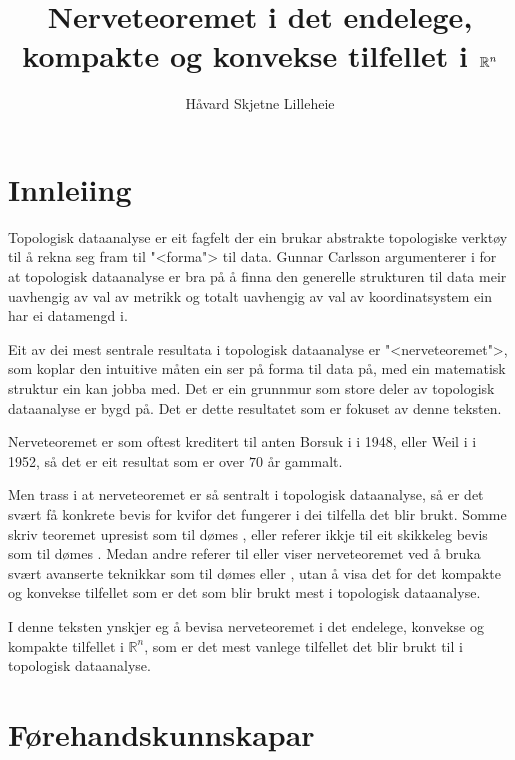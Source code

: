\documentclass[a4paper, 12pt, norsk]{article}
\title{Nerveteoremet i det endelege, kompakte og konvekse tilfellet i \( \Rb^n \)}
\author{Håvard Skjetne Lilleheie}
\theoremstyle{plain}
\theoremstyle{definition}
\newcommand{\Rb}{\mathbb{R}}
\begin{document}
\maketitle

\tableofcontents

\newpage

\section{Innleiing} \label{sec:innleiing}

Topologisk dataanalyse er eit fagfelt der ein brukar abstrakte topologiske verktøy til å rekna seg fram til "<forma"> til data. Gunnar Carlsson argumenterer i \cite{MR2476414} for at topologisk dataanalyse er bra på å finna den generelle strukturen til data meir uavhengig av val av metrikk og totalt uavhengig av val av koordinatsystem ein har ei datamengd i.

Eit av dei mest sentrale resultata i topologisk dataanalyse er "<nerveteoremet">, som koplar den intuitive måten ein ser på forma til data på, med ein matematisk struktur ein kan jobba med. Det er ein grunnmur som store deler av topologisk dataanalyse er bygd på. Det er dette resultatet som er fokuset av denne teksten.

Nerveteoremet er som oftest kreditert til anten Borsuk i \cite{MR28019} i 1948, eller Weil i \cite{MR50280} i 1952, så det er eit resultat som er over \( 70 \) år gammalt.

Men trass i at nerveteoremet er så sentralt i topologisk dataanalyse, så er det svært få konkrete bevis for kvifor det fungerer i dei tilfella det blir brukt. Somme skriv teoremet upresist som til dømes \cite[Theorem 2.1]{MR4381505}, eller referer ikkje til eit skikkeleg bevis som til dømes \cite[Lemma 4.11]{MR3408277}. Medan andre referer til eller viser nerveteoremet ved å bruka svært avanserte teknikkar som til dømes \cite[Corollary 4G.3]{MR1867354} eller \cite[Theorem 15.21]{MR2361455}, utan å visa det for det kompakte og konvekse tilfellet som er det som blir brukt mest i topologisk dataanalyse.

I denne teksten ynskjer eg å bevisa nerveteoremet i det endelege, konvekse og kompakte tilfellet i \( \Rb^n \), som er det mest vanlege tilfellet det blir brukt til i topologisk dataanalyse.

\section{Førehandskunnskapar}
\end{document}
